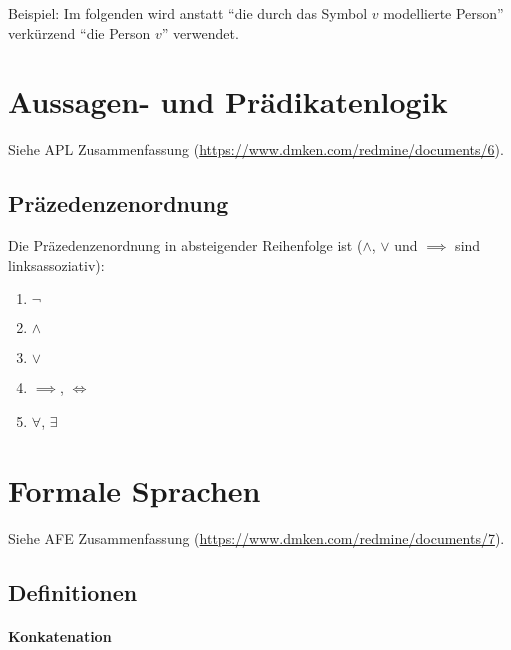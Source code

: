 		    Beispiel: Im folgenden wird anstatt \enquote{die durch das Symbol $ v $ modellierte Person} verkürzend \enquote{die Person $ v $} verwendet.
    
    \section{Aussagen- und Prädikatenlogik}
	    Siehe APL Zusammenfassung (\url{https://www.dmken.com/redmine/documents/6}).
	    
	    \subsection{Präzedenzenordnung}
			Die Präzedenzenordnung in absteigender Reihenfolge ist ($ \land $, $ \lor $ und $ \implies $ sind linksassoziativ):
			\begin{enumerate}
				\item $ \lnot $
				\item $ \land $
				\item $ \lor $
				\item $ \implies $, $ \iff $
				\item $ \forall $, $ \exists $
			\end{enumerate}
    
    \section{Formale Sprachen}
	    Siehe AFE Zusammenfassung (\url{https://www.dmken.com/redmine/documents/7}).
	    
	    \subsection{Definitionen}
		    \paragraph{Konkatenation}
			    
			    

